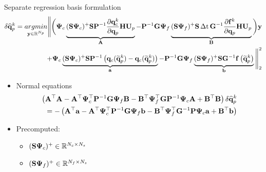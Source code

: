\documentclass[]{beamer}
\begin{document}
\begin{frame}{Separate regression basis formulation}
	\vspace{-1.5em}
	\footnotesize
	\begin{align*}
		\delta \primVecCoef^{\newtonIdx} = \underset{\dummyVec \in \mathbb{R}^{\numPrimModes}}{argmin} \Bigg\lVert \bigg(\deimBasisCons \underbrace{\deimRegressorConsTiny \sampMat \consScaleInv \pde{\consVec^{\newtonIdx}}{\primVec} \primScale \primTrial }_{\dummyMatOne} - \consScaleInv \rhsScale \deimBasisRhs \underbrace{\deimRegressorRhsTiny \sampMat \, \dt \, \rhsScaleInv \pde{\rhsVec^{\newtonIdx}}{\primVec} \primScale \primTrial}_{\dummyMatTwo} \bigg) \dummyVec \\
		+ \deimBasisCons \underbrace{\deimRegressorConsTiny \sampMat \consScaleInv \left( \consVec(\primVecRom^{\newtonIdx}) - \consVec(\primVecRom^{\newtonIdx}) \right)}_{\dummyVecOne} - \consScaleInv \rhsScale \deimBasisRhs \underbrace{\deimRegressorRhsTiny \sampMat \rhsScaleInv \rhsFunc{\primVecRom^{\newtonIdx}}}_{\dummyVecTwo} \Bigg\rVert_2^2
	\end{align*}
	\vspace{-1em}
	\begin{itemize}
		\item Normal equations
		\begin{align*}
			\left(\dummyMatOne^\top \dummyMatOne - \dummyMatOne^\top \deimBasisCons^\top \consScaleInv \rhsScale \deimBasisRhs \dummyMatTwo - \dummyMatTwo^\top \deimBasisRhs^\top \rhsScale \consScaleInv \deimBasisCons \dummyMatOne + \dummyMatTwo^\top \dummyMatTwo \right) \delta \primVecCoef^{\newtonIdx} \\
			= -\left(\dummyMatOne^\top \dummyVecOne - \dummyMatOne^\top \deimBasisCons^\top \consScaleInv \rhsScale \deimBasisRhs \dummyVecTwo - \dummyMatTwo^\top \deimBasisRhs^\top \rhsScaleInv \consScale \deimBasisCons \dummyVecOne + \dummyMatTwo^\top \dummyVecTwo\right)
		\end{align*}
	\end{itemize}
	\normalsize
	\begin{tcolorbox}[colframe=blue!50!white,halign=center]	
	\begin{minipage}{0.49\linewidth}
		\begin{itemize}
			\item Precomputed:
			\begin{itemize}
				\item $\deimRegressorConsTiny \in \mathbb{R}^{\numConsvModes \times \numSamps}$
				\item $\deimRegressorRhsTiny \in \mathbb{R}^{\numRHSModes \times \numSamps}$

\end{itemize}
\end{itemize}
\end{minipage}
\end{tcolorbox}
\end{frame}
\end{document}
